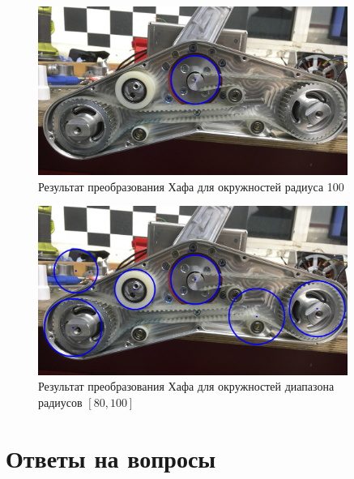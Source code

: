 
\begin{figure}[H]
    \centering
    \includegraphics[width=0.9\textwidth]{../outputs/image8_canny_r100.png}
    \caption{Результат преобразования Хафа для окружностей радиуса 100}
\end{figure}


\begin{figure}[H]
    \centering
    \includegraphics[width=0.9\textwidth]{../outputs/image8_canny_r80110.png}
    \caption{Результат преобразования Хафа для окружностей диапазона радиусов $[80, 100]$}
\end{figure}


\section{Ответы на вопросы}


